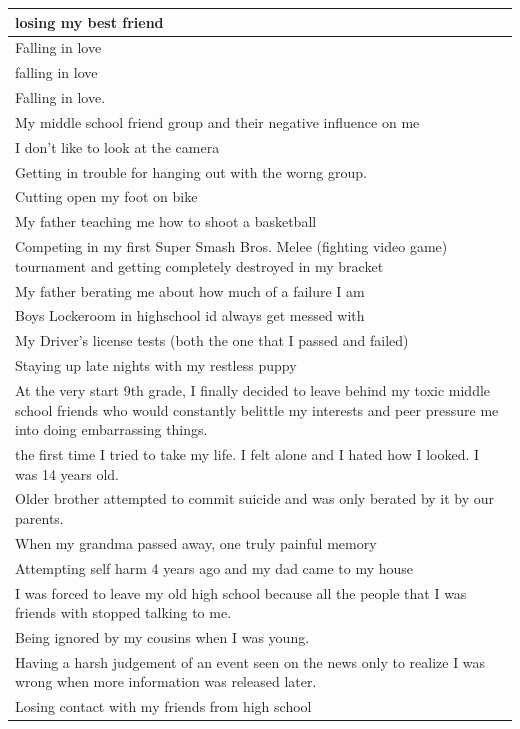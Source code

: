 \documentclass[
  .7em,
  letterpaper,
  DIV=11,
  numbers=noendperiod]{scrartcl}
\begin{document}
\begin{table}
\begin{tabular}{l}
\hline
losing my best friend\\
\hline
Falling in love\\
\hline
falling in love\\
\hline
Falling in love.\\
\hline
My middle school friend group and their negative influence on me\\
\hline
I don't like to look at the camera\\
\hline
Getting in trouble for hanging out with the worng group.\\
\hline
Cutting open my foot on bike\\
\hline
My father teaching me how to shoot a basketball\\
\hline
Competing in my first Super Smash Bros. Melee (fighting video game) tournament and getting completely destroyed in my bracket\\
\hline
My father berating me about how much of a failure I am\\
\hline
Boys Lockeroom in highschool id always get messed with\\
\hline
My Driver's license tests (both the one that I passed and failed)\\
\hline
Staying up late nights with my restless puppy\\
\hline
At the very start 9th grade, I finally decided to leave behind my toxic middle school friends who would constantly belittle my interests and peer pressure me into doing embarrassing things.\\
\hline
the first time I tried to take my life. I felt alone and I hated how I looked. I was 14 years old.\\
\hline
Older brother attempted to commit suicide and was only berated by it by our parents.\\
\hline
When my grandma passed away, one truly painful memory\\
\hline
Attempting self harm 4 years ago and my dad came to my house\\
\hline
I was forced to leave my old high school because all the people that I was friends with stopped talking to me.\\
\hline
Being ignored by my cousins when I was young.\\
\hline
Having a harsh judgement of an event seen on the news only to realize I was wrong when more information was released later.\\
\hline
Losing contact with my friends from high school\\
\hline

\end{tabular}
\end{table}
\end{document}
